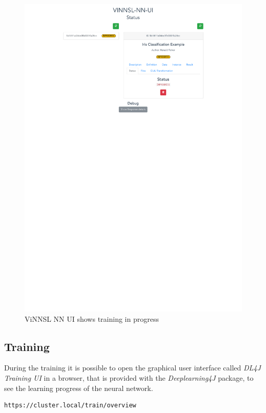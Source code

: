 \begin{figure}
\centering
\includegraphics{images/usecase_1_ui-training}
\caption{ViNNSL NN UI shows training in progress
\label{usecase_1_ui-training}}
\end{figure}

\subsection{Training}\label{training}

During the training it is possible to open the graphical user interface
called \emph{DL4J Training UI} in a browser, that is provided with the
\emph{Deeplearning4J} package, to see the learning progress of the
neural network.

\begin{verbatim}
https://cluster.local/train/overview
\end{verbatim}

